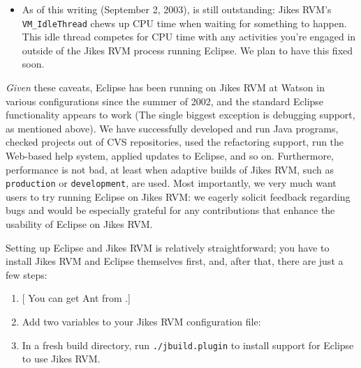 \begin{itemize}
\item As of this writing (September 2, 2003), 
 is still outstanding:
Jikes RVM's {\tt VM\_IdleThread} chews up CPU time when waiting for
something to happen.  This idle thread competes for CPU time
with any activities you're engaged in outside of the Jikes RVM process
running Eclipse.  We plan to have this fixed soon.

\end{itemize}

{\it Given} these caveats, Eclipse has been running on Jikes RVM at
Watson in various configurations since the summer of 2002, and the
standard Eclipse functionality appears to work (The single biggest
exception is debugging support, as mentioned above).  We have
successfully developed and run Java programs, checked projects out of
CVS repositories, used the refactoring support, run the Web-based help
system, applied updates to Eclipse, and so on.  Furthermore,
performance is not bad, at least when adaptive builds of Jikes RVM,
such as {\tt production} or {\tt development}, are used.  Most
importantly, we very much want users to try running Eclipse on Jikes
RVM: we eagerly solicit feedback regarding bugs and would be
especially grateful for any contributions that enhance the usability
of Eclipse on Jikes RVM.

Setting up Eclipse and Jikes RVM is relatively straightforward; you
have to install Jikes RVM and Eclipse themselves first, and, after
that, there are just a few steps:
\begin{enumerate}
\item {}[  You can get Ant from {\tt \antURL}.]{\antURL} 
\item Add two variables to your Jikes RVM configuration file:
\item In a fresh build directory, run {\tt ./jbuild.plugin} to install
support for Eclipse to use Jikes RVM.
\end{enumerate}

